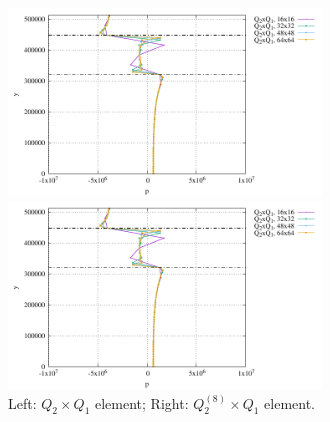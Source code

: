 \begin{center}
\includegraphics[width=8.3cm]{python_codes/fieldstone_53/results/reduced/plines_q2q1.pdf}
\includegraphics[width=8.3cm]{python_codes/fieldstone_53/results/reduced/plines_ser.pdf}\\
{\captionfont Left: $Q_2\times Q_1$ element; Right: $Q_2^{(8)}\times Q_1$ element.}  
\end{center}

